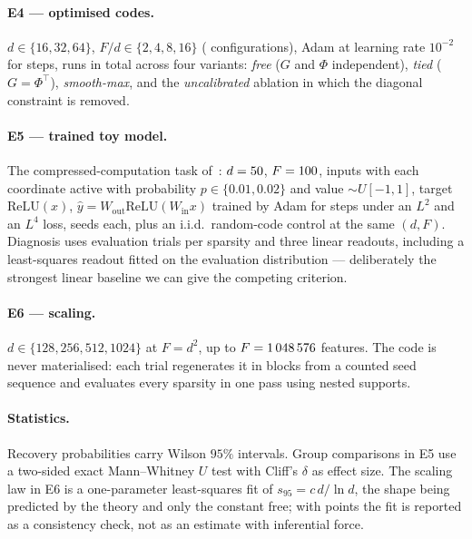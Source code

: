 \paragraph{E4 --- optimised codes.} $d\in\{16,32,64\}$, $F/d\in\{2,4,8,16\}$
(\EfourConfigs{} configurations), Adam at learning rate $10^{-2}$ for \EfourSteps{} steps,
\EfourRuns{} runs in total across four variants: \emph{free} ($G$ and $\Phi$ independent),
\emph{tied} ($G=\Phi^{\top}$), \emph{smooth-max}, and the \emph{uncalibrated} ablation in
which the diagonal constraint is removed.

\paragraph{E5 --- trained toy model.} The compressed-computation task
of~\cite{braun2025apd}: $d=50$, $F=100$, inputs with each coordinate active with
probability $p\in\{0.01,0.02\}$ and value $\sim U[-1,1]$, target $\mathrm{ReLU}(x)$,
$\hat y=W_{\mathrm{out}}\mathrm{ReLU}(W_{\mathrm{in}}x)$ trained by Adam for \EfiveSteps{} steps
under an $L^2$ and an $L^4$ loss, \EfiveSeeds{} seeds each, plus an i.i.d.\ random-code control
at the same $(d,F)$. Diagnosis uses \EfiveEvalTrials{} evaluation trials per sparsity and three
linear readouts, including a least-squares readout fitted on the evaluation distribution ---
deliberately the strongest linear baseline we can give the competing criterion.

\paragraph{E6 --- scaling.} $d\in\{128,256,512,1024\}$ at $F=d^2$, up to
$F=1\,048\,576$ features. The code is never materialised: each trial regenerates it in blocks
from a counted seed sequence and evaluates every sparsity in one pass using nested supports.

\paragraph{Statistics.} Recovery probabilities carry Wilson $95\%$ intervals. Group
comparisons in E5 use a two-sided exact Mann--Whitney $U$ test with Cliff's $\delta$ as effect
size. The scaling law in E6 is a one-parameter least-squares fit of $s_{95}=c\,d/\ln d$, the
shape being predicted by the theory and only the constant free; with \EsixFitPoints{} points
the fit is reported as a consistency check, not as an estimate with inferential force.

